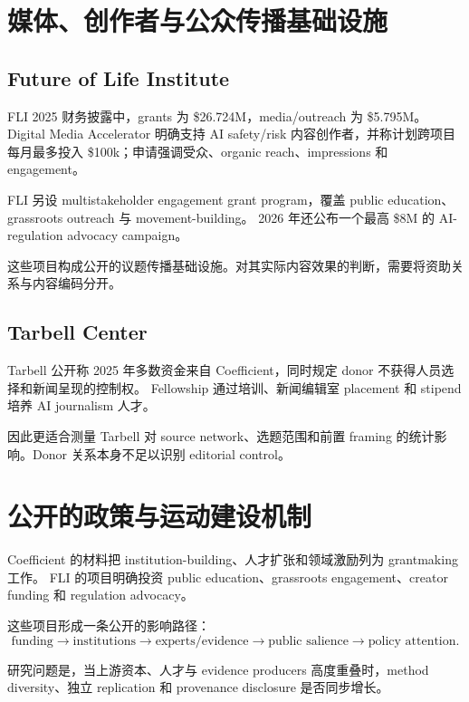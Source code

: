 \documentclass[11pt,twoside]{article}
\begin{document}
\section{媒体、创作者与公众传播基础设施}
\subsection{Future of Life Institute}
FLI 2025 财务披露中，grants 为 \$26.724M，media/outreach 为 \$5.795M。 Digital Media Accelerator 明确支持 AI safety/risk 内容创作者，并称计划跨项目每月最多投入 \$100k；申请强调受众、organic reach、impressions 和 engagement。

FLI 另设 multistakeholder engagement grant program，覆盖 public education、grassroots outreach 与 movement-building。 2026 年还公布一个最高 \$8M 的 AI-regulation advocacy campaign。

这些项目构成公开的议题传播基础设施。对其实际内容效果的判断，需要将资助关系与内容编码分开。

\subsection{Tarbell Center}
Tarbell 公开称 2025 年多数资金来自 Coefficient，同时规定 donor 不获得人员选择和新闻呈现的控制权。 Fellowship 通过培训、新闻编辑室 placement 和 stipend 培养 AI journalism 人才。

因此更适合测量 Tarbell 对 source network、选题范围和前置 framing 的统计影响。Donor 关系本身不足以识别 editorial control。

\section{公开的政策与运动建设机制}
Coefficient 的材料把 institution-building、人才扩张和领域激励列为 grantmaking 工作。 FLI 的项目明确投资 public education、grassroots engagement、creator funding 和 regulation advocacy。

这些项目形成一条公开的影响路径：
\[
\text{funding}\rightarrow\text{institutions}\rightarrow\text{experts/evidence}\rightarrow\text{public salience}\rightarrow\text{policy attention}.
\]

研究问题是，当上游资本、人才与 evidence producers 高度重叠时，method diversity、独立 replication 和 provenance disclosure 是否同步增长。
\end{document}
